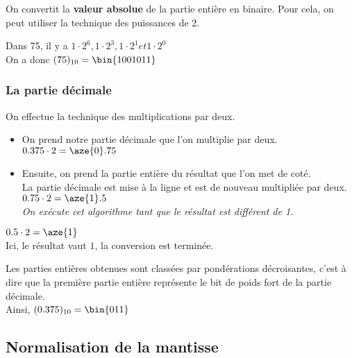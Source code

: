 \documentclass[12pt]{report}
\renewcommand{\bold}[1]{\textbf{#1}}
\newcommand{\italic}[1]{\textit{#1}}
\begin{document}
On convertit la \bold{valeur absolue} de la partie entière en binaire. Pour cela, on peut utiliser la technique des puissances de 2.

Dans 75, il y a $ 1\cdot 2^6, 1\cdot 2^3, 1\cdot 2^1 et 1\cdot 2^0$ \\

On a donc $(75)_{10} = \bin{1001011}$



\subsubsection{La partie décimale}

On effectue la technique des multiplications par deux. \\

\begin{itemize}

	\item On prend notre partie décimale que l'on multiplie par deux. \\

$0.375 \cdot 2 = \aze{0}.75$ \\

	\item Ensuite, on prend la partie entière du résultat que l'on met de coté. \\

La partie décimale est mise à la ligne et est de nouveau multipliée par deux. \\

$0.75 \cdot 2 = \aze{1}.5$ \\

\italic{On exécute cet algorithme tant que le résultat est différent de 1.}

\end{itemize}

$0.5 \cdot 2 = \aze{1}$ \\

Ici, le résultat vaut $1$, la conversion est terminée. 


Les parties entières obtenues sont classées par pondérations décroisantes, c'est à dire que la première partie entière représente le bit de poids fort de la partie décimale. \\

Ainsi, $(0.375)_{10} = \bin{011}$

\subsection{Normalisation de la mantisse}
\end{document}
